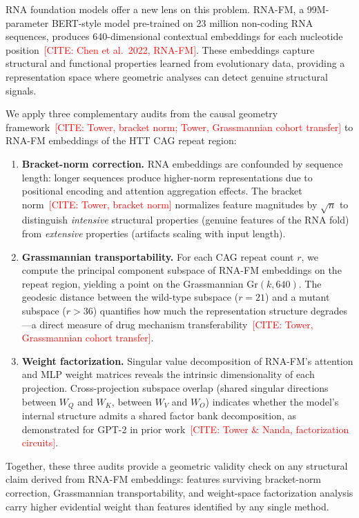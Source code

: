 \documentclass[11pt]{article}
\newcommand{\Gr}{\mathrm{Gr}}
\newcommand{\CITE}[1]{\textcolor{red}{[CITE: #1]}}
\begin{document}
RNA foundation models offer a new lens on this problem. RNA-FM, a
99M-parameter BERT-style model pre-trained on 23 million non-coding RNA
sequences, produces 640-dimensional contextual embeddings for each
nucleotide position~\CITE{Chen et al.~2022, RNA-FM}. These embeddings
capture structural and functional properties learned from evolutionary
data, providing a representation space where geometric analyses can
detect genuine structural signals.

We apply three complementary audits from the causal geometry
framework~\CITE{Tower, bracket norm; Tower, Grassmannian cohort transfer}
to RNA-FM embeddings of the HTT CAG repeat region:

\begin{enumerate}
\item \textbf{Bracket-norm correction.} RNA embeddings are confounded
  by sequence length: longer sequences produce higher-norm
  representations due to positional encoding and attention aggregation
  effects. The bracket norm~\CITE{Tower, bracket norm} normalizes
  feature magnitudes by $\sqrt{n}$ to distinguish \emph{intensive}
  structural properties (genuine features of the RNA fold) from
  \emph{extensive} properties (artifacts scaling with input length).

\item \textbf{Grassmannian transportability.} For each CAG repeat count
  $r$, we compute the principal component subspace of RNA-FM embeddings
  on the repeat region, yielding a point on the Grassmannian
  $\Gr(k, 640)$. The geodesic distance between the wild-type subspace
  ($r = 21$) and a mutant subspace ($r > 36$) quantifies how much the
  representation structure degrades---a direct measure of drug
  mechanism transferability~\CITE{Tower, Grassmannian cohort transfer}.

\item \textbf{Weight factorization.} Singular value decomposition of
  RNA-FM's attention and MLP weight matrices reveals the intrinsic
  dimensionality of each projection. Cross-projection subspace overlap
  (shared singular directions between $W_Q$ and $W_K$, between $W_V$
  and $W_O$) indicates whether the model's internal structure admits a
  shared factor bank decomposition, as demonstrated for GPT-2 in prior
  work~\CITE{Tower \& Nanda, factorization circuits}.
\end{enumerate}

Together, these three audits provide a geometric validity check on any
structural claim derived from RNA-FM embeddings: features surviving
bracket-norm correction, Grassmannian transportability, and weight-space
factorization analysis carry higher evidential weight than features
identified by any single method.
\end{document}
